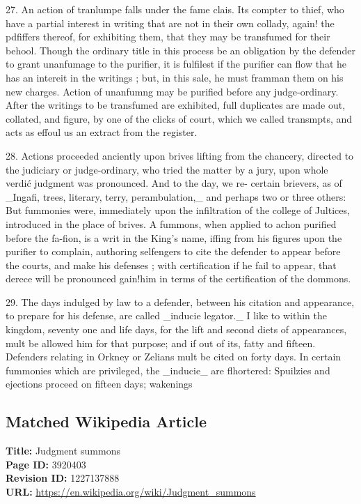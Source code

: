 \documentclass{article}
\begin{document}
27. An action of tranlumpe falls under the fame clais. Its compter to thief, who have a partial interest in writing that are not in their own collady, again! the pdfiffers thereof, for exhibiting them, that they may be transfumed for their behool. Though the ordinary title in this process be an obligation by the defender to grant unanfumage to the purifier, it is fulfilest if the purifier can flow that he has an intereit in the writings ; but, in this sale, he must framman them on his new charges. Action of unanfumng may be purified before any judge-ordinary. After the writings to be transfumed are exhibited, full duplicates are made out, collated, and figure, by one of the clicks of court, which we called transmpts, and acts as effoul us an extract from the register.

28. Actions proceeded anciently upon brives lifting from the chancery, directed to the judiciary or judge-ordinary, who tried the matter by a jury, upon whole verdić judgment was pronounced. And to the day, we re- certain brievers, as of \_Ingafi, trees, literary, terry, perambulation,\_ and perhaps two or three others: But fummonies were, immediately upon the infiltration of the college of Jultices, introduced in the place of brives. A fummons, when applied to achon purified before the fa-fion, is a writ in the King's name, iffing from his figures upon the purifier to complain, authoring selfengers to cite the defender to appear before the courts, and make his defenses ; with certification if he fail to appear, that derece will be pronounced gain!him in terms of the certification of the dommons.

29. The days indulged by law to a defender, between his citation and appearance, to prepare for his defense, are called \_inducie legator.\_ I like to within the kingdom, seventy one and life days, for the lift and second diets of appearances, mult be allowed him for that purpose; and if out of its, fatty and fifteen. Defenders relating in Orkney or Zelians mult be cited on forty days. In certain fummonies which are privileged, the \_inducie\_ are flhortered: Spuilzies and ejections proceed on fifteen days; wakenings

\subsection*{Matched Wikipedia Article}
\textbf{Title:} Judgment summons \\
\textbf{Page ID:} 3920403 \\
\textbf{Revision ID:} 1227137888 \\
\textbf{URL:} \url{https://en.wikipedia.org/wiki/Judgment\_summons}
\end{document}
